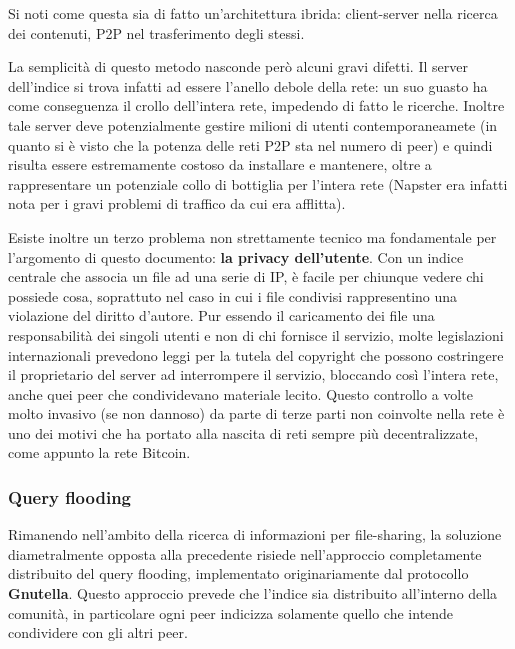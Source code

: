 Si noti come questa sia di fatto un'architettura ibrida: client-server nella ricerca dei contenuti, P2P nel trasferimento degli stessi.

La semplicità di questo metodo nasconde però alcuni gravi difetti. Il server dell'indice si trova infatti ad essere l'anello debole della rete: un suo guasto ha come conseguenza il crollo dell'intera rete, impedendo di fatto le ricerche. Inoltre tale server deve potenzialmente gestire milioni di utenti contemporaneamete (in quanto si è visto che la potenza delle reti P2P sta nel numero di peer) e quindi risulta essere estremamente costoso da installare e mantenere, oltre a rappresentare un potenziale collo di bottiglia per l'intera rete (Napster era infatti nota per i gravi problemi di traffico da cui era afflitta).

Esiste inoltre un terzo problema non strettamente tecnico ma fondamentale per l'argomento di questo documento: \textbf{la privacy dell'utente}. Con un indice centrale che associa un file ad una serie di IP, è facile per chiunque vedere chi possiede cosa, soprattuto nel caso in cui i file condivisi rappresentino una violazione del diritto d'autore. Pur essendo il caricamento dei file una responsabilità dei singoli utenti e non di chi fornisce il servizio, molte legislazioni internazionali prevedono leggi per la tutela del copyright che possono costringere il proprietario del server ad interrompere il servizio, bloccando così l'intera rete, anche quei peer che condividevano materiale lecito. Questo controllo a volte molto invasivo (se non dannoso) da parte di terze parti non coinvolte nella rete è uno dei motivi che ha portato alla nascita di reti sempre più decentralizzate, come appunto la rete Bitcoin.

\subsubsection{Query flooding}\label{query-flooding}
 Rimanendo nell'ambito della ricerca di informazioni per file-sharing, la soluzione diametralmente opposta alla precedente risiede nell'approccio completamente distribuito del query flooding, implementato originariamente dal protocollo \textbf{Gnutella}. Questo approccio prevede che l'indice sia distribuito all'interno della comunità, in particolare ogni peer indicizza solamente quello che intende condividere con gli altri peer.

